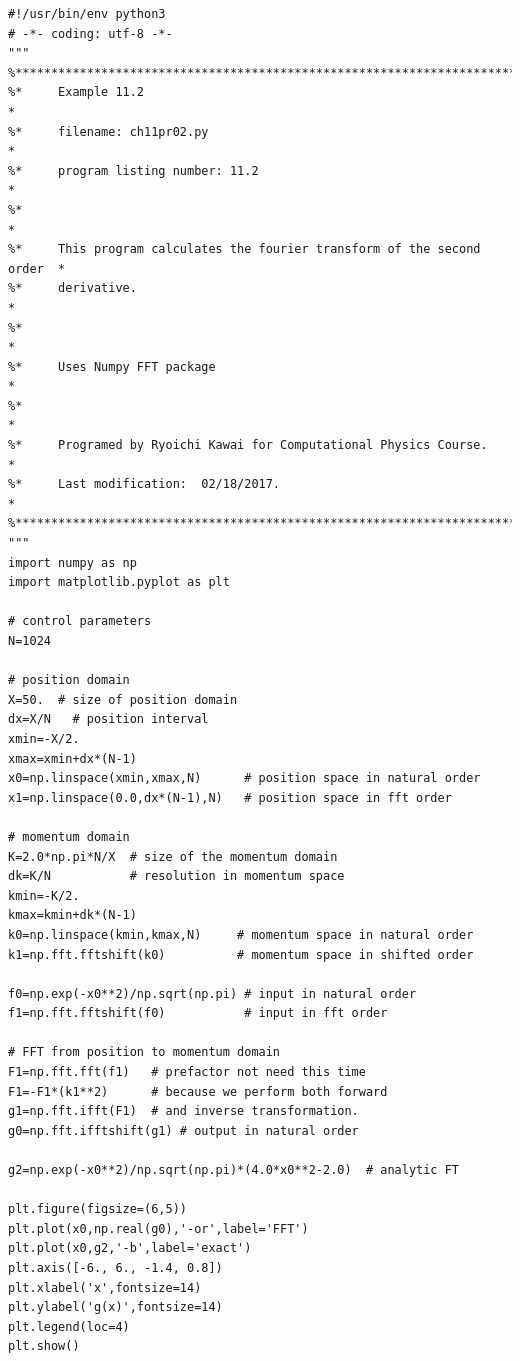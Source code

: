 \bigskip
\noindent
\program
\footnotesize
\begin{verbatim}
#!/usr/bin/env python3
# -*- coding: utf-8 -*-
"""
%**************************************************************************
%*     Example 11.2                                                       *
%*     filename: ch11pr02.py                                              *
%*     program listing number: 11.2                                       *
%*                                                                        *
%*     This program calculates the fourier transform of the second order  *
%*     derivative.                                                        *
%*                                                                        *
%*     Uses Numpy FFT package                                             *
%*                                                                        *
%*     Programed by Ryoichi Kawai for Computational Physics Course.       *
%*     Last modification:  02/18/2017.                                    *
%**************************************************************************
"""
import numpy as np
import matplotlib.pyplot as plt

# control parameters
N=1024

# position domain
X=50.  # size of position domain
dx=X/N   # position interval
xmin=-X/2.
xmax=xmin+dx*(N-1)
x0=np.linspace(xmin,xmax,N)      # position space in natural order
x1=np.linspace(0.0,dx*(N-1),N)   # position space in fft order

# momentum domain
K=2.0*np.pi*N/X  # size of the momentum domain
dk=K/N           # resolution in momentum space
kmin=-K/2.
kmax=kmin+dk*(N-1)
k0=np.linspace(kmin,kmax,N)     # momentum space in natural order
k1=np.fft.fftshift(k0)          # momentum space in shifted order

f0=np.exp(-x0**2)/np.sqrt(np.pi) # input in natural order
f1=np.fft.fftshift(f0)           # input in fft order

# FFT from position to momentum domain
F1=np.fft.fft(f1)   # prefactor not need this time
F1=-F1*(k1**2)      # because we perform both forward
g1=np.fft.ifft(F1)  # and inverse transformation.
g0=np.fft.ifftshift(g1) # output in natural order

g2=np.exp(-x0**2)/np.sqrt(np.pi)*(4.0*x0**2-2.0)  # analytic FT

plt.figure(figsize=(6,5))
plt.plot(x0,np.real(g0),'-or',label='FFT')
plt.plot(x0,g2,'-b',label='exact')
plt.axis([-6., 6., -1.4, 0.8])
plt.xlabel('x',fontsize=14)
plt.ylabel('g(x)',fontsize=14)
plt.legend(loc=4)
plt.show()
\end{verbatim}
\normalsize

